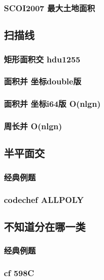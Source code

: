 \documentclass[10pt,a4paper]{article}
\begin{document}
\subsubsection{SCOI2007 最大土地面积}

\subsection{扫描线}
\subsubsection{矩形面积交 hdu1255}

\subsubsection{面积并 坐标double版}

\subsubsection{面积并 坐标i64版 O(nlgn)}

\subsubsection{周长并 O(nlgn)}

\subsection{半平面交}
\subsubsection{经典例题}

\subsubsection{codechef ALLPOLY}

\subsection{不知道分在哪一类}
\subsubsection{经典例题}

\subsubsection{cf 598C}

\end{document}
